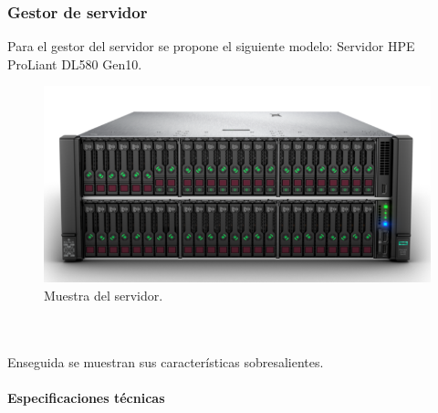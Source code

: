 \documentclass[12pt,letterpaper]{article}
\begin{document}
\subsubsection{Gestor de servidor}
Para el gestor del servidor se propone el siguiente modelo: Servidor HPE ProLiant DL580 Gen10.
\begin{figure}[ht]
    \centering
    \includegraphics[scale=.3]{imagenes/servidor.PNG}
    \caption{Muestra del servidor.}
\end{figure}
\\ \\
Enseguida se muestran sus características sobresalientes. \cite{servidorhp}
\\ \\
\textbf{Especificaciones técnicas}
\end{document}

